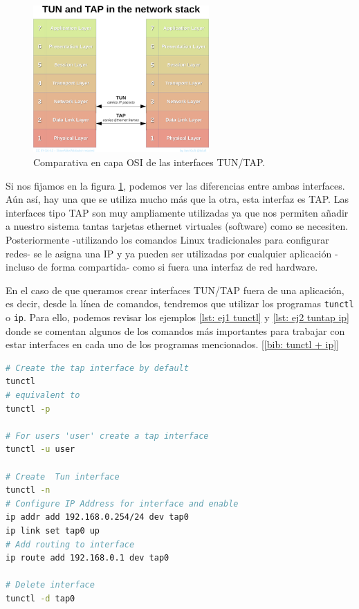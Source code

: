 \documentclass[a4paper, oneside, 12pt]{book}
\begin{document}
	\vspace{5px}

	\begin{figure}[h!]
		\begin{center}
			\includegraphics[width=0.6\textwidth]{img/tun_vs_tap.png}
			\caption{Comparativa en capa OSI de las interfaces TUN/TAP.}
			\label{img: tun vs tap}
		\end{center}
	\end{figure}
	
	\noindent Si nos fijamos en la figura \ref{img: tun vs tap}, podemos ver las diferencias entre ambas interfaces. Aún así, hay una que se utiliza mucho más que la otra, esta interfaz es TAP. Las interfaces tipo TAP son muy ampliamente utilizadas ya que nos permiten añadir a nuestro sistema tantas tarjetas ethernet virtuales (software) como se necesiten. Posteriormente -utilizando los comandos Linux tradicionales para configurar redes- se le asigna una IP y ya pueden ser utilizadas por cualquier aplicación -incluso de forma compartida- como si fuera una interfaz de red hardware.
	
	\pagebreak
	
	\noindent En el caso de que queramos crear interfaces TUN/TAP fuera de una aplicación, es decir, desde la línea de comandos, tendremos que utilizar los programas \texttt{tunctl} o \texttt{ip}. Para ello, podemos revisar los ejemplos \ref{lst: ej1 tunctl} y \ref{lst: ej2 tuntap ip} donde se comentan algunos de los comandos más importantes para trabajar con estar interfaces en cada uno de los programas mencionados. [\ref{bib: tunctl + ip}]
	
	\vspace{10px}
	
	\begin{lstlisting}[language=Bash, label=lst: ej1 tunctl, caption=Ejemplo de uso de \texttt{tunctl} para controlar interfaces TUN/TAP]
# Create the tap interface by default
tunctl 
# equivalent to
tunctl -p

# For users 'user' create a tap interface
tunctl -u user

# Create  Tun interface
tunctl -n
# Configure IP Address for interface and enable
ip addr add 192.168.0.254/24 dev tap0
ip link set tap0 up
# Add routing to interface
ip route add 192.168.0.1 dev tap0

# Delete interface
tunctl -d tap0
	\end{lstlisting}
\end{document}
